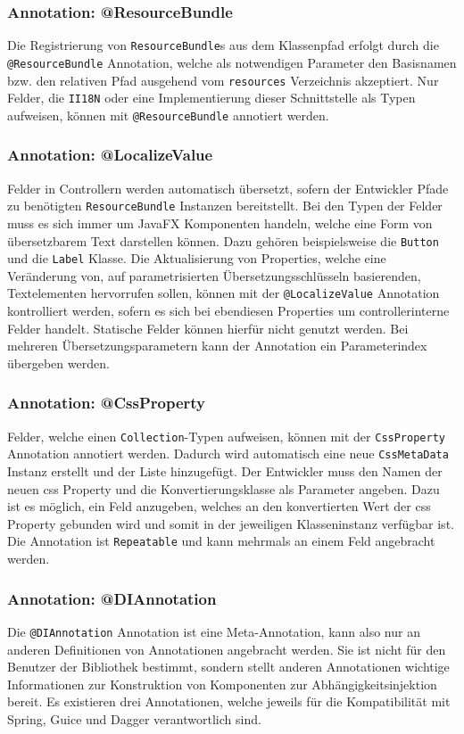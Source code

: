 \subsubsection{Annotation: @ResourceBundle}
Die Registrierung von \texttt{ResourceBundle}s aus dem Klassenpfad erfolgt durch die \texttt{@ResourceBundle} Annotation, welche als notwendigen Parameter den Basisnamen bzw. den relativen Pfad ausgehend vom \texttt{resources} Verzeichnis akzeptiert. Nur Felder, die \texttt{II18N} oder eine Implementierung dieser Schnittstelle als Typen aufweisen, können mit \texttt{@ResourceBundle} annotiert werden.
\subsubsection{Annotation: @LocalizeValue}
Felder in Controllern werden automatisch übersetzt, sofern der Entwickler Pfade zu benötigten \texttt{ResourceBundle} Instanzen bereitstellt. Bei den Typen der Felder muss es sich immer um JavaFX Komponenten handeln, welche eine Form von übersetzbarem Text darstellen können. Dazu gehören beispielsweise die \texttt{Button} und die \texttt{Label} Klasse. Die Aktualisierung von Properties, welche eine Veränderung von, auf parametrisierten Übersetzungsschlüsseln basierenden, Textelementen hervorrufen sollen, können mit der \texttt{@LocalizeValue} Annotation kontrolliert werden, sofern es sich bei ebendiesen Properties um controllerinterne Felder handelt. Statische Felder können hierfür nicht genutzt werden. Bei mehreren Übersetzungsparametern kann der Annotation ein Parameterindex übergeben werden.
\subsubsection{Annotation: @CssProperty}
Felder, welche einen \texttt{Collection}-Typen aufweisen, können mit der \texttt{CssProperty} Annotation annotiert werden. Dadurch wird automatisch eine neue \texttt{CssMetaData} Instanz erstellt und der Liste hinzugefügt. Der Entwickler muss den Namen der neuen \ac{css} Property und die Konvertierungsklasse als Parameter angeben. Dazu ist es möglich, ein Feld anzugeben, welches an den konvertierten Wert der \ac{css} Property gebunden wird und somit in der jeweiligen Klasseninstanz verfügbar ist. Die Annotation ist \texttt{Repeatable} und kann mehrmals an einem Feld angebracht werden.
\subsubsection{Annotation: @DIAnnotation}
Die \texttt{@DIAnnotation} Annotation ist eine Meta-Annotation, kann also nur an anderen Definitionen von Annotationen angebracht werden. Sie ist nicht für den Benutzer der Bibliothek bestimmt, sondern stellt anderen Annotationen wichtige Informationen zur Konstruktion von Komponenten zur Abhängigkeitsinjektion bereit. Es existieren drei Annotationen, welche jeweils für die Kompatibilität mit Spring, Guice und Dagger verantwortlich sind.

